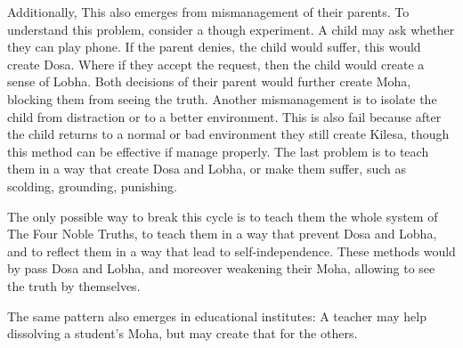 \documentclass[12pt,a4paper]{article}
\begin{document}
	Additionally, This also emerges from mismanagement of their parents. To understand this problem, consider a though experiment. A child may ask whether they can play phone. If the parent denies, the child would suffer, this would create Dosa. Where if they accept the request, then the child would create a sense of Lobha. Both decisions of their parent would further create Moha, blocking them from seeing the truth. Another mismanagement is to isolate the child from distraction or to a better environment. This is also fail because after the child returns to a normal or bad environment they still create Kilesa, though this method can be effective if manage properly. The last problem is to teach them in a way that create Dosa and Lobha, or make them suffer, such as scolding, grounding, punishing.
	
	The only possible way to break this cycle is to teach them the whole system of The Four Noble Truths, to teach them in a way that prevent Dosa and Lobha, and to reflect them in a way that lead to self-independence. These methods would by pass Dosa and Lobha, and moreover weakening their Moha, allowing to see the truth by themselves.
	
	The same pattern also emerges in educational institutes: A teacher may help dissolving a student's Moha, but may create that for the others.
	



\end{document}
